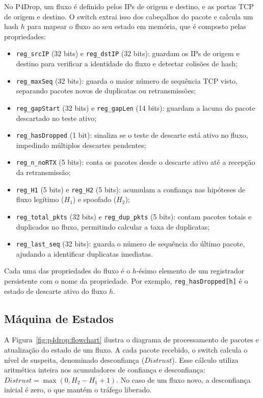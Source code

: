 \documentclass[12pt]{article}
\begin{document}
No P4Drop, um fluxo é definido pelos IPs de origem e destino, e as portas TCP de origem e destino.
O switch extrai isso dos cabeçalhos do pacote e calcula um hash $h$ para mapear o fluxo ao seu estado em memória,
que é composto pelas propriedades:
\begin{itemize}
    \item \texttt{reg\_srcIP} (32 bits) e \texttt{reg\_dstIP} (32 bits):
    guardam os IPs de origem e destino para verificar a identidade do fluxo e detectar colisões de hash;
    \item \texttt{reg\_maxSeq} (32 bits): guarda o maior número de sequência TCP visto,
    separando pacotes novos de duplicatas ou retransmissões;
    \item \texttt{reg\_gapStart} (32 bits) e \texttt{reg\_gapLen} (14 bits):
    guardam a lacuna do pacote descartado no teste ativo;
    \item \texttt{reg\_hasDropped} (1 bit): sinaliza se o teste de descarte está ativo no fluxo,
    impedindo múltiplos descartes pendentes;
    \item \texttt{reg\_n\_noRTX} (5 bits): conta os pacotes desde o descarte ativo até a recepção da retransmissão;
    \item \texttt{reg\_H1} (5 bits) e \texttt{reg\_H2} (5 bits):
    acumulam a confiança nas hipóteses de fluxo legítimo ($H_1$) e spoofado ($H_2$);
    \item \texttt{reg\_total\_pkts} (32 bits) e \texttt{reg\_dup\_pkts} (5 bits):
    contam pacotes totais e duplicados no fluxo, permitindo calcular a taxa de duplicatas;
    \item \texttt{reg\_last\_seq} (32 bits): guarda o número de sequência do último pacote,
    ajudando a identificar duplicatas imediatas.
\end{itemize}
Cada uma das propriedades do fluxo é o $h$-ésimo elemento de um registrador persistente com o nome da propriedade.
Por exemplo, \texttt{reg\_hasDropped[h]} é o estado de descarte ativo do fluxo $h$.

\subsection{Máquina de Estados}

A Figura~\ref{fig:p4drop:flowchart} ilustra o diagrama de processamento de pacotes e atualização do estado de um fluxo.
A cada pacote recebido, o switch calcula o nível de suspeita, denominado desconfiança ($Distrust$).
Esse cálculo utiliza aritmética inteira nos acumuladores de confiança e desconfiança: $Distrust = \max(0, H_2 - H_1 + 1)$.
No caso de um fluxo novo, a desconfiança inicial é zero, o que mantém o tráfego liberado.
\end{document}
